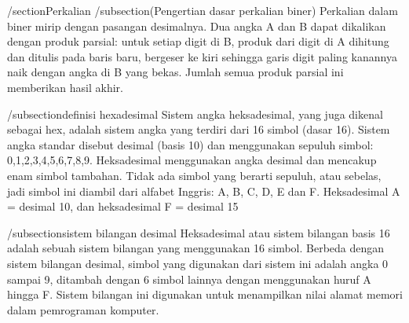 /section{Perkalian}
/subsection(Pengertian dasar perkalian biner)
Perkalian dalam biner mirip dengan pasangan desimalnya. Dua angka A dan B dapat dikalikan dengan produk parsial: 
untuk setiap digit di B, produk dari digit di A dihitung dan ditulis pada baris baru, bergeser ke kiri sehingga 
garis digit paling kanannya naik dengan angka di B yang bekas. Jumlah semua produk parsial ini memberikan hasil akhir.

/subsection{definisi hexadesimal}
Sistem angka heksadesimal, yang juga dikenal sebagai hex, adalah sistem angka yang terdiri dari 16 simbol (dasar 16). 
Sistem angka standar disebut desimal (basis 10) dan menggunakan sepuluh simbol: 0,1,2,3,4,5,6,7,8,9. Heksadesimal 
menggunakan angka desimal dan mencakup enam simbol tambahan. Tidak ada simbol yang berarti sepuluh, atau sebelas, 
jadi simbol ini diambil dari alfabet Inggris: A, B, C, D, E dan F. Heksadesimal A = desimal 10, dan heksadesimal F = desimal 15

/subsection{sistem bilangan desimal}
Heksadesimal atau sistem bilangan basis 16 adalah sebuah sistem bilangan yang menggunakan 16 simbol. Berbeda dengan sistem bilangan desimal, simbol yang digunakan dari sistem ini adalah angka 0 sampai 9, ditambah dengan 6 simbol lainnya dengan menggunakan huruf A hingga F. Sistem bilangan ini digunakan untuk menampilkan nilai alamat memori dalam pemrograman komputer.
